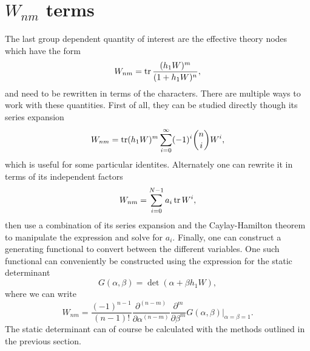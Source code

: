 \section{\texorpdfstring{$W_{nm}$}{Wnm} terms}
\label{sec-evaluating-polyakov-coupling-terms}

The last group dependent quantity of interest are the effective theory nodes
which have the form
%
\begin{equation}
  W_{nm} = \operatorname{tr} \frac{(h_1 W)^m}{(1 + h_1 W)^n},
\end{equation}
%
and need to be rewritten in terms of the characters. There are multiple ways to
work with these quantities. First of all, they can be studied
directly though its series expansion
%
\begin{equation}
  W_{nm} = \operatorname{tr} (h_1 W)^m \sum_{i=0}^{\infty} (-1)^i \binom{n}{i} W^i,
\end{equation}
%
which is useful for some particular identites. Alternately one can rewrite it in
terms of its independent factors
%
\begin{equation}
  W_{nm} = \sum_{i=0}^{N-1} a_i \operatorname{tr}{W^i},
\end{equation}
%
then use a combination of its series expansion and the Caylay-Hamilton theorem
to manipulate the expression and solve for $a_i$. Finally, one can construct a
generating functional to convert between the different variables. One such
functional can conveniently be constructed using the expression for the static
determinant
%
\begin{equation}
  G(\alpha,\beta) = \det ( \alpha + \beta h_1 W ),
\end{equation}
%
where we can write
%
\begin{equation}
  W_{nm} = \frac{(-1)^{n-1}}{(n-1)!} \frac{\partial^{(n-m)}}{\partial \alpha^{(n-m)}}
    \frac{\partial^{m}}{\partial \beta^m} G(\alpha,\beta)
    \bigg|_{\alpha=\beta=1}.
\end{equation}
%
The static determinant can of course be calculated with the methods outlined in
the previous section.
